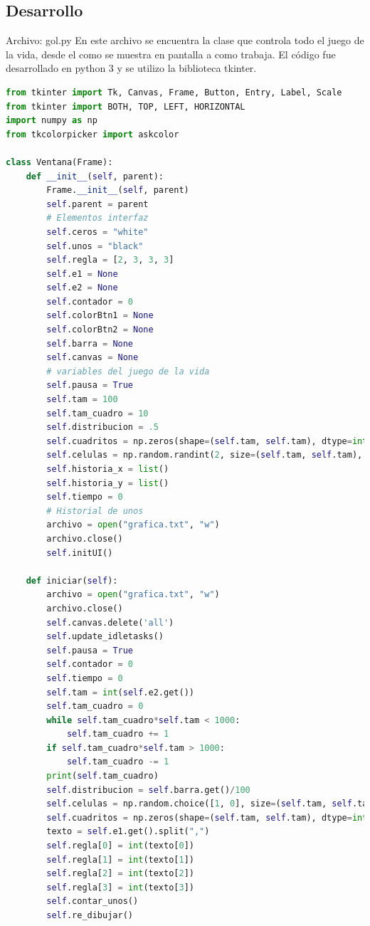\subsection{Desarrollo}
Archivo: gol.py
En este archivo se encuentra la clase que controla todo el juego de la vida, desde el como se muestra en pantalla a como trabaja. El código fue desarrollado en python 3 y se utilizo la biblioteca tkinter.
\begin{lstlisting}[language=Python]
from tkinter import Tk, Canvas, Frame, Button, Entry, Label, Scale
from tkinter import BOTH, TOP, LEFT, HORIZONTAL
import numpy as np
from tkcolorpicker import askcolor

class Ventana(Frame):
    def __init__(self, parent):
        Frame.__init__(self, parent)
        self.parent = parent
        # Elementos interfaz
        self.ceros = "white"
        self.unos = "black"
        self.regla = [2, 3, 3, 3]
        self.e1 = None
        self.e2 = None
        self.contador = 0
        self.colorBtn1 = None
        self.colorBtn2 = None
        self.barra = None
        self.canvas = None
        # variables del juego de la vida
        self.pausa = True
        self.tam = 100
        self.tam_cuadro = 10
        self.distribucion = .5
        self.cuadritos = np.zeros(shape=(self.tam, self.tam), dtype=int)
        self.celulas = np.random.randint(2, size=(self.tam, self.tam), dtype=int)
        self.historia_x = list()
        self.historia_y = list()
        self.tiempo = 0
        # Historial de unos
        archivo = open("grafica.txt", "w")
        archivo.close()
        self.initUI()

    def iniciar(self):
        archivo = open("grafica.txt", "w")
        archivo.close()
        self.canvas.delete('all')
        self.update_idletasks()
        self.pausa = True
        self.contador = 0
        self.tiempo = 0
        self.tam = int(self.e2.get())
        self.tam_cuadro = 0
        while self.tam_cuadro*self.tam < 1000:
            self.tam_cuadro += 1
        if self.tam_cuadro*self.tam > 1000:
            self.tam_cuadro -= 1
        print(self.tam_cuadro)
        self.distribucion = self.barra.get()/100
        self.celulas = np.random.choice([1, 0], size=(self.tam, self.tam), p=[self.distribucion, 1-self.distribucion])
        self.cuadritos = np.zeros(shape=(self.tam, self.tam), dtype=int)
        texto = self.e1.get().split(",")
        self.regla[0] = int(texto[0])
        self.regla[1] = int(texto[1])
        self.regla[2] = int(texto[2])
        self.regla[3] = int(texto[3])
        self.contar_unos()
        self.re_dibujar()



\end{lstlisting}
